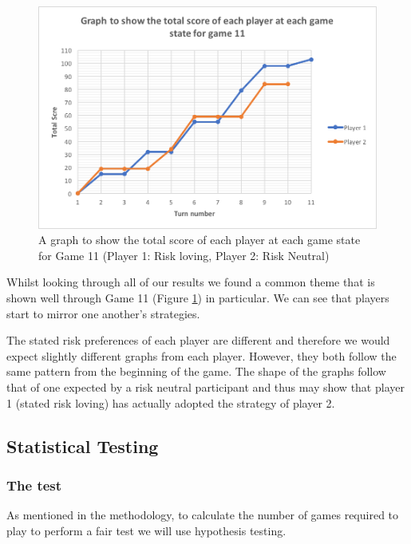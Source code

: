 \documentclass[a4paper,titlepage]{article}
\begin{document}
\begin{figure}
\includegraphics[scale=1]{game11}
\caption{A graph to show the total score of each player at each game state for Game 11 (Player 1: Risk loving, Player 2: Risk Neutral)\label{figure14}}
\end{figure}
Whilst looking through all of our results we found a common theme that is shown well through Game 11 (Figure \ref{figure14}) in particular. We can see that players start to mirror one another’s strategies.

The stated risk preferences of each player are different and therefore we would expect slightly different graphs from each player. However, they both follow the same pattern from the beginning of the game. The shape of the graphs follow that of one expected by a risk neutral participant and thus may show that player 1 (stated risk loving) has actually adopted the strategy of player 2.
\subsection{Statistical Testing}
\subsubsection{The test}
As mentioned in the methodology, to calculate the number of games required to play to perform a fair test we will use hypothesis testing.
\end{document}
